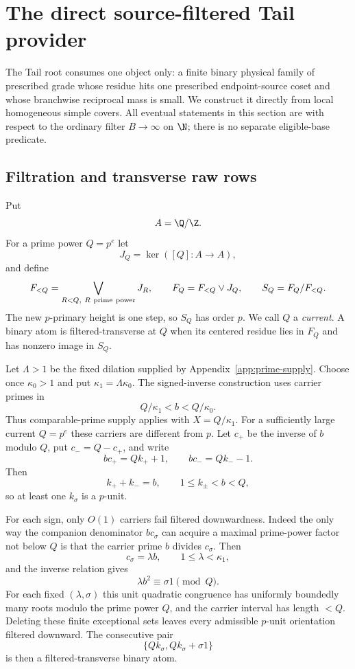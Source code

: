 
\section{The direct source-filtered Tail provider}
\label{sec:ltar-provider}

The Tail root consumes one object only: a finite binary physical family of
prescribed grade whose residue hits one prescribed endpoint-source coset and
whose branchwise reciprocal mass is small.  We construct it directly from
local homogeneous simple covers.  All eventual statements in this section are
with respect to the ordinary filter $B\to\infty$ on $\N$; there is no separate
eligible-base predicate.

\subsection{Filtration and transverse raw rows}

Put
\[
A=\Q/\Z.
\]
For a prime power $Q=p^e$ let
\[
J_Q=\ker([Q]:A\to A),
\]
and define
\[
F_{<Q}=\bigvee_{R<Q,\ R\ {\rm prime\ power}}J_R,
\qquad
F_Q=F_{<Q}\vee J_Q,
\qquad
S_Q=F_Q/F_{<Q}.
\]
The new $p$-primary height is one step, so $S_Q$ has order $p$.  We call $Q$ a
\emph{current}.  A binary atom is filtered-transverse at $Q$ when its centered
residue lies in $F_Q$ and has nonzero image in $S_Q$.

Let $\Lambda>1$ be the fixed dilation supplied by
Appendix~\ref{app:prime-supply}.  Choose once $\kappa_0>1$ and put
$\kappa_1=\Lambda\kappa_0$.  The signed-inverse construction uses carrier
primes in
\[
Q/\kappa_1<b<Q/\kappa_0.
\]
Thus comparable-prime supply applies with $X=Q/\kappa_1$.
For a sufficiently large current $Q=p^e$ these carriers are different from
$p$.  Let $c_+$ be the inverse of $b$ modulo $Q$, put $c_-=Q-c_+$, and write
\[
bc_+=Qk_++1,
\qquad
bc_-=Qk_--1.
\tag{T1}\label{eq:signed-inverse-r14}
\]
Then
\[
k_++k_-=b,
\qquad
1\le k_\pm<b<Q,
\]
so at least one $k_\sigma$ is a $p$-unit.

For each sign, only $O(1)$ carriers fail filtered downwardness.  Indeed the
only way the companion denominator $bc_\sigma$ can acquire a maximal
prime-power factor not below $Q$ is that the carrier prime $b$ divides
$c_\sigma$.  Then
\[
c_\sigma=\lambda b,
\qquad 1\le\lambda<\kappa_1,
\]
and the inverse relation gives
\[
\lambda b^2\equiv\sigma1\pmod Q.
\]
For each fixed $(\lambda,\sigma)$ this unit quadratic congruence has uniformly
boundedly many roots modulo the prime power $Q$, and the carrier interval has
length $<Q$.  Deleting these finite exceptional sets leaves every admissible
$p$-unit orientation filtered downward.  The consecutive pair
\[
\{Qk_\sigma,Qk_\sigma+\sigma1\}
\]
is then a filtered-transverse binary atom.

